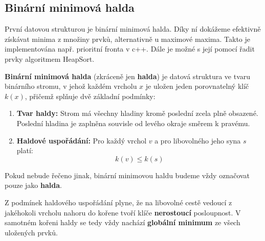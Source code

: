 \begin{center}
    
\end{center}

\newpage

\subsection{Binární minimová halda}

První datovou strukturou je binární minimová halda. Díky ní dokážeme efektivně získávat minima z množiny prvků, alternativně u maximové maxima. Takto je implementována např. prioritní fronta v c++. Dále je možné s její pomocí řadit prvky algoritmem HeapSort. \medskip

\begin{definition}
\textbf{Binární minimová halda} (zkráceně jen \textbf{halda}) je datová struktura ve tvaru binárního stromu, v jehož každém vrcholu $x$ je uložen jeden porovnatelný klíč $k(x)$, přičemž splňuje dvě základní podmínky:
\begin{enumerate}
    \item \textbf{Tvar haldy:} Strom má všechny hladiny kromě poslední zcela plně obsazené. Poslední hladina je zaplněna souvisle od levého okraje směrem k pravému.
    \item \textbf{Haldové uspořádání:} Pro každý vrchol $v$ a pro libovolného jeho syna $s$ platí:
    $$k(v) \le k(s)$$
\end{enumerate}
\end{definition} \bigskip

\begin{remark}
  Pokud nebude řečeno jinak, binární minimovou haldu budeme vždy označovat pouze jako \textbf{halda}.
\end{remark}

\begin{observation}
Z podmínek haldového uspořádání plyne, že na libovolné cestě vedoucí z jakéhokoli vrcholu nahoru do kořene tvoří klíče \textbf{nerostoucí} posloupnost. V samotném kořeni haldy se tedy vždy nachází \textbf{globální minimum} ze všech uložených prvků.
\end{observation} \bigskip

\begin{center}
    
\end{center}

